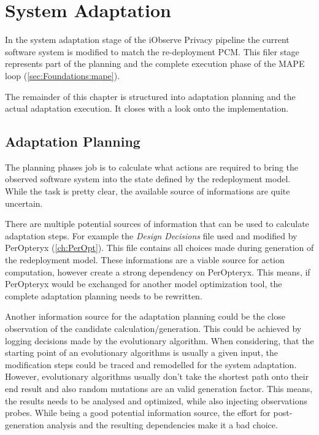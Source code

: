 \chapter{System Adaptation}
\label{ch:SysAdap}

In the system adaptation stage of the iObserve Privacy pipeline the current software system is modified to match the re-deployment PCM. This filer stage represents part of the planning and the complete execution phase of the MAPE loop (\autoref{sec:Foundations:mape}).

The remainder of this chapter is structured into adaptation planning and the actual adaptation execution. It closes with a look onto the implementation.


\section{Adaptation Planning}
\label{sec:SysAdap:plan}

The planning phases job is to calculate what actions are required to bring the observed software system into the state defined by the redeployment model. While the task is pretty clear, the available source of informations are quite uncertain.

There are multiple potential sources of information that can be used to calculate adaptation steps. For example the \textit{Design Decisions} file used and modified by PerOpteryx (\autoref{ch:PerOpt}). This file contains all choices made during generation of the redeployment model. These informations are a viable source for action computation, however create a strong dependency on PerOpteryx. This means, if PerOpteryx would be exchanged for another model optimization tool, the complete adaptation planning needs to be rewritten.

Another information source for the adaptation planning could be the close observation of the candidate calculation/generation. This could be achieved by logging decisions made by the evolutionary algorithm. When considering, that the starting point of an evolutionary algorithms is usually a given input, the modification steps could be traced and remodelled for the system adaptation. However, evolutionary algorithms usually don't take the shortest path onto their end result and also random mutations are an valid generation factor. This means, the results needs to be analysed and optimized, while also injecting observations probes. While being a good potential information source, the effort for post-generation analysis and the resulting dependencies make it a bad choice.

